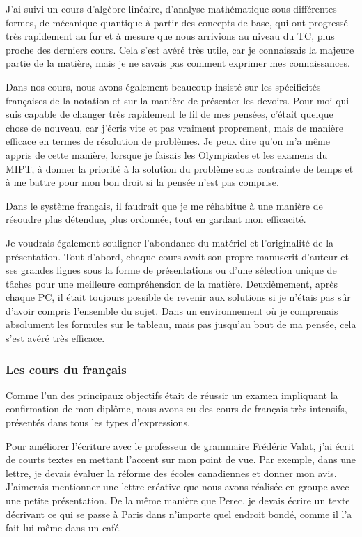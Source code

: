 \documentclass[a4paper,12pt]{article}
\begin{document}
J'ai suivi un cours d'algèbre linéaire, d'analyse mathématique sous différentes formes, de mécanique quantique à partir des concepts de base, qui ont progressé très rapidement au fur et à mesure que nous arrivions au niveau du TC, plus proche des derniers cours. Cela s'est avéré très utile, car je connaissais la majeure partie de la matière, mais je ne savais pas comment exprimer mes connaissances. 

Dans nos cours, nous avons également beaucoup insisté sur les spécificités françaises de la notation et sur la manière de présenter les devoirs. Pour moi qui suis capable de changer très rapidement le fil de mes pensées, c'était quelque chose de nouveau, car j'écris vite et pas vraiment proprement, mais de manière efficace en termes de résolution de problèmes. Je peux dire qu'on m'a même appris de cette manière, lorsque je faisais les Olympiades et les examens du MIPT, à donner la priorité à la solution du problème sous contrainte de temps et à me battre pour mon bon droit si la pensée n'est pas comprise. 

Dans le système français, il faudrait que je me réhabitue à une manière de résoudre plus détendue, plus ordonnée, tout en gardant mon efficacité. 

Je voudrais également souligner l'abondance du matériel et l'originalité de la présentation. Tout d'abord, chaque cours avait son propre manuscrit d'auteur et ses grandes lignes sous la forme de présentations ou d'une sélection unique de tâches pour une meilleure compréhension de la matière. Deuxièmement, après chaque PC, il était toujours possible de revenir aux solutions si je n'étais pas sûr d'avoir compris l'ensemble du sujet. Dans un environnement où je comprenais absolument les formules sur le tableau, mais pas jusqu'au bout de ma pensée, cela s'est avéré très efficace. 

\subsubsection{Les cours du français}

Comme l'un des principaux objectifs était de réussir un examen impliquant la confirmation de mon diplôme, nous avons eu des cours de français très intensifs, présentés dans tous les types d'expressions.

Pour améliorer l'écriture avec le professeur de grammaire Frédéric Valat, j'ai écrit de courts textes en mettant l'accent sur mon point de vue. Par exemple, dans une lettre, je devais évaluer la réforme des écoles canadiennes et donner mon avis. J'aimerais mentionner une lettre créative que nous avons réalisée en groupe avec une petite présentation. De la même manière que Perec, je devais écrire un texte décrivant ce qui se passe à Paris dans n'importe quel endroit bondé, comme il l'a fait lui-même dans un café. 
\end{document}
